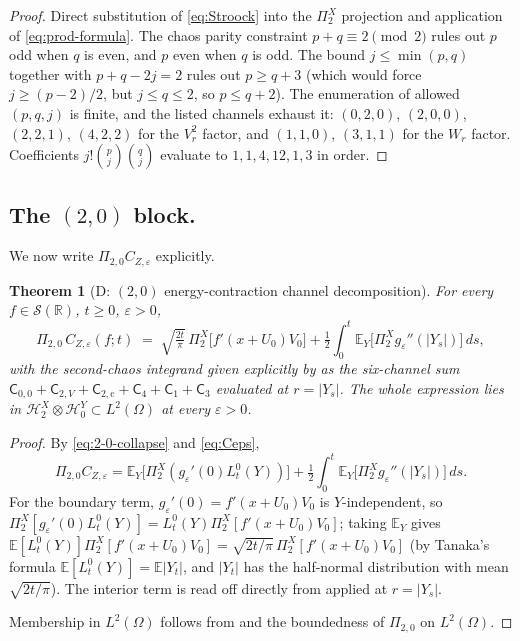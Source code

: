 \documentclass[11pt,reqno]{amsart}
\theoremstyle{plain}
\newtheorem{theorem}{Theorem}[section]
\theoremstyle{definition}
\theoremstyle{remark}
\newcommand{\R}{\mathbb{R}}
\newcommand{\E}{\mathbb{E}}
\newcommand{\Hilb}{\mathcal{H}}
\newcommand{\IBM}{Z}
\newcommand{\Pir}{\Pi}
\newcommand{\Channel}[1]{\mathsf{C}_{#1}}
\begin{document}
\begin{proof}
Direct substitution of \eqref{eq:Stroock} into the
$\Pir_2^X$ projection and application of \eqref{eq:prod-formula}.
The chaos parity constraint $p+q\equiv 2\pmod 2$ rules out $p$ odd
when $q$ is even, and $p$ even when $q$ is odd. The bound
$j\le\min(p,q)$ together with $p+q-2j=2$ rules out $p\ge q+3$ (which
would force $j\ge(p-2)/2$, but $j\le q\le 2$, so $p\le q+2$). The
enumeration of allowed $(p,q,j)$ is finite, and the listed channels
exhaust it: $(0,2,0)$, $(2,0,0)$, $(2,2,1)$, $(4,2,2)$ for the
$V_r^2$ factor, and $(1,1,0)$, $(3,1,1)$ for the $W_r$ factor.
Coefficients $j!\binom{p}{j}\binom{q}{j}$ evaluate to $1,1,4,12,1,3$
in order.
\end{proof}

\subsection*{The \texorpdfstring{$(2,0)$}{(2,0)} block.}
We now write $\Pir_{2,0}C_{\IBM,\varepsilon}$ explicitly.

\begin{theorem}[D: \texorpdfstring{$(2,0)$}{(2,0)} energy-contraction channel decomposition]
\label{thm:2-0}
For every $f\in\mathscr S(\R)$, $t\ge 0$, $\varepsilon>0$,
\begin{equation}\label{eq:2-0-explicit}
 \Pir_{2,0}\,C_{\IBM,\varepsilon}(f;t)
 \;=\;\sqrt{\tfrac{2t}{\pi}}\,\Pir_2^X\!\bigl[f'(x+U_0)V_0\bigr]
   +\tfrac12\!\int_0^t\!\!\!\E_Y\!\bigl[\Pir_2^X g_\varepsilon''(|Y_s|)\bigr]\,ds,
\end{equation}
with the second-chaos integrand given explicitly by
 as the six-channel sum
$\Channel{0,0}+\Channel{2,V}+\Channel{2,\mathrm{c}}+\Channel{4}+\Channel{1}+\Channel{3}$
evaluated at $r=|Y_s|$. The whole expression lies in
$\Hilb_2^X\otimes\Hilb_0^Y\subset L^{2}(\Omega)$ at every
$\varepsilon>0$.
\end{theorem}

\begin{proof}
By \eqref{eq:2-0-collapse} and \eqref{eq:Ceps},
\[
 \Pir_{2,0}C_{\IBM,\varepsilon}
 =\E_Y\!\bigl[\Pir_2^X(g_\varepsilon'(0)L_t^0(Y))\bigr]
  +\tfrac12\!\int_0^t\!\E_Y\!\bigl[\Pir_2^X g_\varepsilon''(|Y_s|)\bigr]\,ds.
\]
For the boundary term, $g_\varepsilon'(0)=f'(x+U_0)V_0$ is
$Y$-independent, so
$\Pir_2^X[g_\varepsilon'(0)L_t^0(Y)]=L_t^0(Y)\Pir_2^X[f'(x+U_0)V_0]$;
taking $\E_Y$ gives $\E[L_t^0(Y)]\Pir_2^X[f'(x+U_0)V_0]=\sqrt{2t/\pi}\,\Pir_2^X[f'(x+U_0)V_0]$
(by Tanaka's formula $\E[L_t^0(Y)]=\E|Y_t|$, and $|Y_t|$ has the
half-normal distribution with mean $\sqrt{2t/\pi}$). The
interior term is read off directly from
 applied at $r=|Y_s|$.

Membership in $L^{2}(\Omega)$ follows from  and the
boundedness of $\Pir_{2,0}$ on $L^{2}(\Omega)$.
\end{proof}
\end{document}
